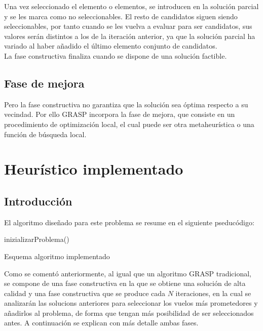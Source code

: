 Una vez seleccionado el elemento o elementos, se introducen en la solución parcial y se les marca como no seleccionables. El resto de candidatos siguen siendo seleccionables, por tanto cuando se les vuelva a evaluar para ser candidatos, sus valores serán distintos a los de la iteración anterior, ya que la solución parcial ha variado al haber añadido el último elemento conjunto de candidatos.\\

La fase constructiva finaliza cuando se dispone de una solución factible.
\subsection{Fase de mejora}
Pero la fase constructiva no garantiza que la solución sea óptima respecto a su vecindad. Por ello GRASP incorpora la fase de mejora, que consiste en un procedimiento de optimización local, el cual puede ser otra metaheurística o una función de búsqueda local.
\section{Heurístico implementado}
\subsection{Introducción}
El algoritmo diseñado para este problema se resume en el siguiente pseducódigo:\\

\begin{algorithm}[H]

	inizializarProblema()\;
\caption{Esquema algoritmo implementado}
\end{algorithm}

Como se comentó anteriormente, al igual que un algoritmo GRASP tradicional, se compone de una fase constructiva en la que se obtiene una solución de alta calidad y una fase constructiva que se produce cada $N$ iteraciones, en la cual se analizarán las solucions anteriores para seleccionar los vuelos más prometedores y añadirlos al problema, de forma que tengan más posibilidad de ser seleccionados antes. A continuación se explican con más detalle ambas fases.



